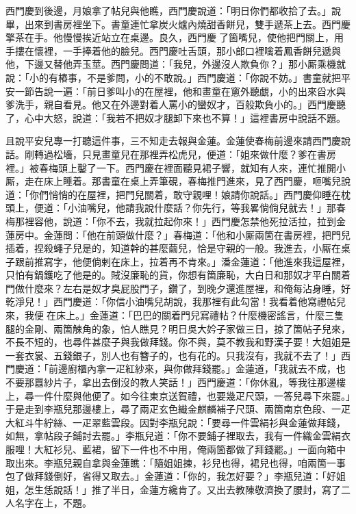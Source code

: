 西門慶到後邊，月娘拿了帖兒與他瞧，西門慶說道：「明日你們都收拾了去。」說畢，出來到書房裡坐下。書童連忙拿炭火爐內燒甜香餅兒，雙手遞茶上去。{}西門慶擎茶在手。他慢慢挨近站立在桌邊。{}良久，西門慶𢫓了箇嘴兒，使他把門關上，用手摟在懷裡，一手捧着他的臉兒。西門慶吐舌頭，那小郎口裡噙着鳳香餅兒遞與他，下邊又替他弄玉莖。西門慶問道：「我兒，外邊沒人欺負你？」那小厮乘機就說：「小的有樁事，不是爹問，小的不敢說。」西門慶道：「你說不妨。」書童就把平安一節告說一遍：「前日爹叫小的在屋裡，他和畫童在窻外聽覷，小的出來舀水與爹洗手，親自看見。他又在外邊對着人罵小的蠻奴才，百般欺負小的。」西門慶聽了，心中大怒，說道：「我若不把奴才腿卸下來也不算！」這裡書房中說話不題。

且說平安兒專一打聽這件事，三不知走去報與金蓮。金蓮使春梅前邊來請西門慶說話。剛轉過松墻，只見畫童兒在那裡弄松虎兒，{}便道：「姐來做什麼？爹在書房裡。」被春梅頭上鑿了一下。西門慶在裡面聽見裙子響，就知有人來，連忙推開小厮，走在床上睡着。那書童在桌上弄筆硯，春梅推門進來，見了西門慶，咂嘴兒說道：「你們悄悄的在屋裡，把門兒關着，敢守親哩！娘請你說話。」西門慶仰睡在枕頭上，便道：「小油嘴兒，他請我說什麼話？你先行，等我畧倘倘兒就去！」那春梅那裡容他，說道：「你不去，我就拉起你來！」西門慶怎禁他死拉活拉，拉到金蓮房中。金蓮問：「他在前頭做什麼？」春梅道：「他和小厮兩箇在書房裡，把門兒插着，捏殺蠅子兒是的，知道幹的甚麼繭兒，恰是守親的一般。我進去，小厮在桌子跟前推寫字，他便倘剌在床上，拉着再不肯來。」潘金蓮道：「他進來我這屋裡，只怕有鍋鑊吃了他是的。{}賊沒廉恥的貨，你想有箇廉恥，大白日和那奴才平白關着門做什麼來？左右是奴才臭屁股門子，鑽了，到晚夕還進屋裡，和俺每沾身睡，好乾淨兒！」{}西門慶道：「你信小油嘴兒胡說，我那裡有此勾當！我看着他寫禮帖兒來，我便𢱉在床上。」金蓮道：「巴巴的關着門兒寫禮帖？什麼機密謠言，什麼三隻腿的金剛、兩箇觫角的象，{}怕人瞧見？明日吳大妗子家做三日，掠了箇帖子兒來，不長不短的，也尋件甚麼子與我做拜錢。你不與，莫不教我和野漢子要！大姐姐是一套衣裳、五錢銀子，別人也有簪子的，也有花的。只我沒有，我就不去了！」西門慶道：「前邊廚櫃內拿一疋紅紗來，與你做拜錢罷。」金蓮道，「我就去不成，也不要那囂紗片子，拿出去倒沒的教人笑話！」西門慶道：「你休亂，等我往那邊樓上，尋一件什麼與他便了。如今往東京送賀禮，也要幾疋尺頭，一答兒尋下來罷。」于是走到李瓶兒那邊樓上，尋了兩疋玄色織金麒麟補子尺頭、兩箇南京色段、一疋大紅斗牛紵絲、一疋翠藍雲段。因對李瓶兒說：「要尋一件雲絹衫與金蓮做拜錢，如無，拿帖段子鋪討去罷。」李瓶兒道：「你不要鋪子裡取去，我有一件織金雲絹衣服哩！大紅衫兒、藍裙，留下一件也不中用，俺兩箇都做了拜錢罷。」一面向箱中取出來。李瓶兒親自拿與金蓮瞧：「隨姐姐揀，衫兒也得，裙兒也得，咱兩箇一事包了做拜錢倒好，省得又取去。」金蓮道：「你的，我怎好要？」李瓶兒道：「好姐姐，怎生恁說話！」推了半日，金蓮方纔肯了。又出去教陳敬濟換了腰封，寫了二人名字在上，不題。

